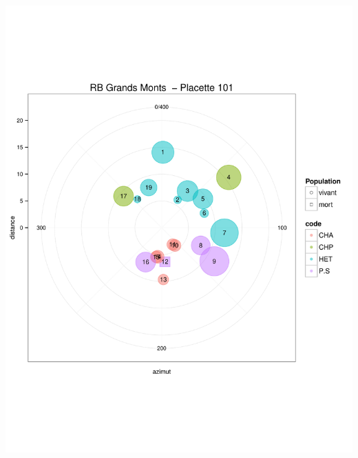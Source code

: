 \documentclass[a4paper]{book}\usepackage[]{graphicx}\usepackage[]{color}
\makeatletter
\def\maxwidth{ %
  \ifdim\Gin@nat@width>\linewidth
    \linewidth
  \else
    \Gin@nat@width
  \fi
}
\newenvironment{knitrout}{}{} %
\makeatother
\begin{document}
\begin{knitrout}
\color{fgcolor}

{\centering \includegraphics[width=\maxwidth]{Figures/PlanArbres-1} 

}





\end{knitrout}
\end{document}

